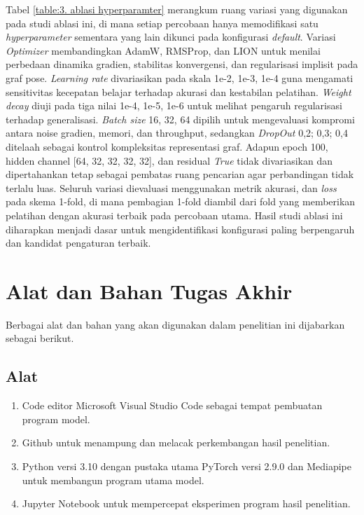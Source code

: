 Tabel \ref{table:3. ablasi hyperparamter} merangkum ruang variasi yang digunakan pada studi ablasi ini, di mana setiap percobaan hanya memodifikasi satu \textit{hyperparameter} sementara yang lain dikunci pada konfigurasi \textit{default}. Variasi \textit{Optimizer} membandingkan AdamW, RMSProp, dan LION untuk menilai perbedaan dinamika gradien, stabilitas konvergensi, dan regularisasi implisit pada graf pose. \textit{Learning rate} divariasikan pada skala {1e-2, 1e-3, 1e-4} guna mengamati sensitivitas kecepatan belajar terhadap akurasi dan kestabilan pelatihan. \textit{Weight decay} diuji pada tiga nilai {1e-4, 1e-5, 1e-6} untuk melihat pengaruh regularisasi terhadap generalisasi. \textit{Batch size} {16, 32, 64} dipilih untuk mengevaluasi kompromi antara noise gradien, memori, dan throughput, sedangkan \textit{DropOut} {0,2; 0,3; 0,4} ditelaah sebagai kontrol kompleksitas representasi graf. Adapun epoch 100, hidden channel [64, 32, 32, 32, 32], dan residual \textit{True} tidak divariasikan dan dipertahankan tetap sebagai pembatas ruang pencarian agar perbandingan tidak terlalu luas. Seluruh variasi dievaluasi menggunakan metrik akurasi, dan \textit{loss} pada skema 1-fold, di mana pembagian 1-fold diambil dari fold yang memberikan pelatihan dengan akurasi terbaik pada percobaan utama. Hasil studi ablasi ini diharapkan menjadi dasar untuk mengidentifikasi konfigurasi paling berpengaruh dan kandidat pengaturan terbaik. \par

\section{Alat dan Bahan Tugas Akhir} \label{III.alat dan bahan}
Berbagai alat dan bahan yang akan digunakan dalam penelitian ini dijabarkan sebagai berikut. \par

\subsection{Alat} \label{III.alat}
\begin{enumerate}[noitemsep]
	\item Code editor Microsoft Visual Studio Code sebagai tempat pembuatan program model.
	\item Github untuk menampung dan melacak perkembangan hasil penelitian.
    \item Python versi 3.10 dengan pustaka utama PyTorch versi 2.9.0 dan Mediapipe untuk membangun program utama model.
    \item Jupyter Notebook untuk mempercepat eksperimen program hasil penelitian.
\end{enumerate}


